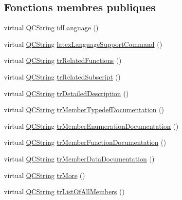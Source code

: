 \subsection*{Fonctions membres publiques}
\begin{DoxyCompactItemize}
\item 
virtual \hyperlink{class_q_c_string}{Q\+C\+String} \hyperlink{class_translator_serbian_cyrillic_aeeb4b73fec8f2f8df4df12738893b200}{id\+Language} ()
\item 
virtual \hyperlink{class_q_c_string}{Q\+C\+String} \hyperlink{class_translator_serbian_cyrillic_a68646868262f568aa5d23fa4fd094a15}{latex\+Language\+Support\+Command} ()
\item 
virtual \hyperlink{class_q_c_string}{Q\+C\+String} \hyperlink{class_translator_serbian_cyrillic_adc1f4d26bb85ea1be22c2092b2d21783}{tr\+Related\+Functions} ()
\item 
virtual \hyperlink{class_q_c_string}{Q\+C\+String} \hyperlink{class_translator_serbian_cyrillic_a1c9921cc810aa49a9d19a4fbdb034e8d}{tr\+Related\+Subscript} ()
\item 
virtual \hyperlink{class_q_c_string}{Q\+C\+String} \hyperlink{class_translator_serbian_cyrillic_aea457c0ab51df7694f0070e34bb6309d}{tr\+Detailed\+Description} ()
\item 
virtual \hyperlink{class_q_c_string}{Q\+C\+String} \hyperlink{class_translator_serbian_cyrillic_a752841f3a2514a9fa1c47244903e4712}{tr\+Member\+Typedef\+Documentation} ()
\item 
virtual \hyperlink{class_q_c_string}{Q\+C\+String} \hyperlink{class_translator_serbian_cyrillic_a9f5755ce6f2841cca1744a056318fc48}{tr\+Member\+Enumeration\+Documentation} ()
\item 
virtual \hyperlink{class_q_c_string}{Q\+C\+String} \hyperlink{class_translator_serbian_cyrillic_a36eb139bb421a0c0a269d97d5da81798}{tr\+Member\+Function\+Documentation} ()
\item 
virtual \hyperlink{class_q_c_string}{Q\+C\+String} \hyperlink{class_translator_serbian_cyrillic_a9abe011418662c8a690e4a36d70057bb}{tr\+Member\+Data\+Documentation} ()
\item 
virtual \hyperlink{class_q_c_string}{Q\+C\+String} \hyperlink{class_translator_serbian_cyrillic_a93da2b0552deac88efa773051690e57b}{tr\+More} ()
\item 
virtual \hyperlink{class_q_c_string}{Q\+C\+String} \hyperlink{class_translator_serbian_cyrillic_a3ba4d97ac221e7d170cff784d9bd4e6e}{tr\+List\+Of\+All\+Members} ()
\item 

\end{DoxyCompactItemize}
